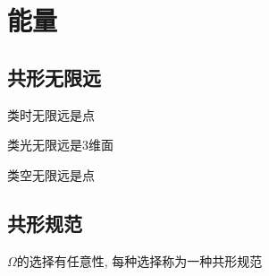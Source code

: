 \chapter{能量}

\section{共形无限远}

类时无限远是点

类光无限远是3维面

类空无限远是点

\section{共形规范}

$\Omega$的选择有任意性, 每种选择称为一种共形规范
